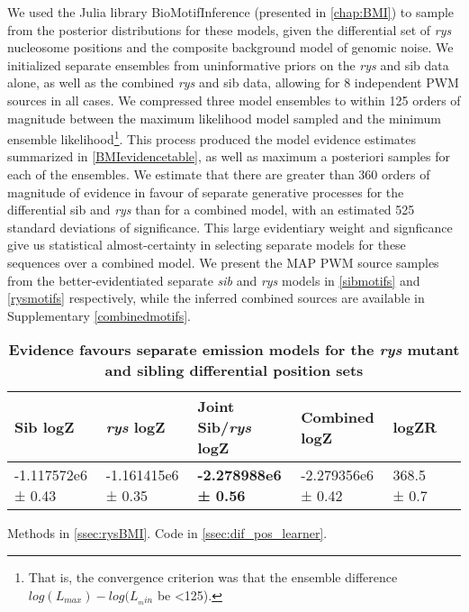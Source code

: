 We used the Julia library BioMotifInference (presented in \autoref{chap:BMI}) to sample from the posterior distributions for these models, given the differential set of \textit{rys} nucleosome positions and the composite background model of genomic noise. We initialized separate ensembles from uninformative priors on the \textit{rys} and sib data alone, as well as the combined \textit{rys} and sib data, allowing for 8 independent PWM sources in all cases. We compressed three model ensembles to within 125 orders of magnitude between the maximum likelihood model sampled and the minimum ensemble likelihood\footnote{That is, the convergence criterion was that the ensemble difference $log(L_{max})-log(L_{_min}$ be <125).}. This process produced the model evidence estimates summarized in \autoref{BMIevidencetable}, as well as maximum a posteriori samples for each of the ensembles. We estimate that there are greater than 360 orders of magnitude of evidence in favour of separate generative processes for the differential sib and \textit{rys} than for a combined model, with an estimated 525 standard deviations of significance. This large evidentiary weight and signficance give us statistical almost-certainty in selecting separate models for these sequences over a combined model. We present the MAP PWM source samples from the better-evidentiated separate \textit{sib} and \textit{rys} models in \autoref{sibmotifs} and \autoref{rysmotifs} respectively, while the inferred combined sources are available in Supplementary \autoref{combinedmotifs}.

\begin{table}[!ht]
    \centering
    \caption{{\bf Evidence favours separate emission models for the \textit{rys} mutant and sibling differential position sets}}
    \begin{tabular}{|l|l|l|l|l|l|}
        \hline {\bf Sib logZ} & {\bf \textit{rys} logZ} & {\bf Joint Sib/\textit{rys} logZ} & {\bf Combined logZ} & {\bf logZR} \\ \hline
        -1.117572e6 ± 0.43 & -1.161415e6 ± 0.35 & {\bf -2.278988e6 ± 0.56} & -2.279356e6 ± 0.42 &  368.5 ± 0.7 \\ \hline
        \end{tabular}
    \begin{flushleft}
        Methods in \autoref{ssec:rysBMI}.
        Code in \autoref{ssec:dif_pos_learner}.
    \end{flushleft}
    \label{BMIevidencetable}
\end{table}

